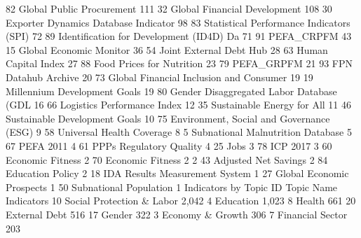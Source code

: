    82    Global Public Procurement                         111
   32    Global Financial Development                      108
   30    Exporter Dynamics Database {\ENDASH} Indicator             98
   83    Statistical Performance Indicators (SPI)           72
   89    Identification for Development (ID4D) Da           71
   91    PEFA_CRPFM                                         43
   15    Global Economic Monitor                            36
   54    Joint External Debt Hub                            28
   63    Human Capital Index                                27
   88    Food Prices for Nutrition                          23
   79    PEFA_GRPFM                                         21
   93    FPN Datahub Archive                                20
   73    Global Financial Inclusion and Consumer            19
   19    Millennium Development Goals                       19
   80    Gender Disaggregated Labor Database (GDL           16
   66    Logistics Performance Index                        12
   35    Sustainable Energy for All                         11
   46    Sustainable Development Goals                      10
   75    Environment, Social and Governance (ESG)            9
   58    Universal Health Coverage                           8
   5     Subnational Malnutrition Database                   5
   67    PEFA 2011                                           4
   61    PPPs Regulatory Quality                             4
   25    Jobs                                                3
   78    ICP 2017                                            3
   60    Economic Fitness                                    2
   70    Economic Fitness 2                                  2
   43    Adjusted Net Savings                                2
   84    Education Policy                                    2
   18    IDA Results Measurement System                      1
   27    Global Economic Prospects                           1
   50    Subnational Population                              1
{\smallskip}
  Indicators by Topic
{\smallskip}
   ID    Topic Name                                   Indicators
   10    Social Protection \& Labor                       2,042
   4     Education                                       1,023
   8     Health                                            661
   20    External Debt                                     516
   17    Gender                                            322
   3     Economy \& Growth                                  306
   7     Financial Sector                                  203

